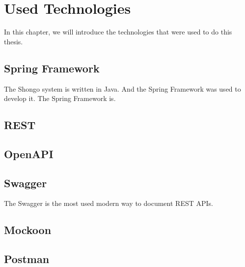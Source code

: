 \chapter{Used Technologies}
In this chapter, we will introduce the technologies that were used to do this thesis.

\section{Spring Framework}
The Shongo system is written in Java. And the Spring Framework was used to develop it. \cite{spring}
The Spring Framework is. \cite{walls2022spring}

\section{REST} \label{rest}

\section{OpenAPI}

\section{Swagger}
The Swagger is the most used modern way to document REST APIs.

\section{Mockoon}

\section{Postman}
